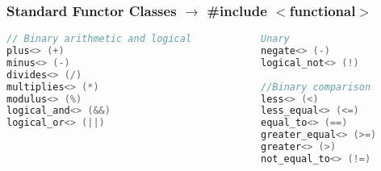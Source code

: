 \subsubsection{Standard Functor Classes $\rightarrow$ \#include $<$functional$>$}
\begin{lstlisting}[style=frame, style= linenumbers, language=C]
// Binary arithmetic and logical            Unary
plus<> (+)                                  negate<> (-)
minus<> (-)                                 logical_not<> (!)
divides<> (/)
multiplies<> (*)                            //Binary comparison
modulus<> (%)                               less<> (<)
logical_and<> (&&)                          less_equal<> (<=)
logical_or<> (||)                           equal_to<> (==)
                                            greater_equal<> (>=)
                                            greater<> (>)
                                            not_equal_to<> (!=)
\end{lstlisting}
